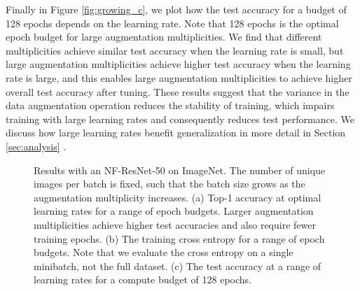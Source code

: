 \documentclass{article}
\begin{document}
Finally in Figure \ref{fig:growing_c}, we plot how the test accuracy for a budget of 128 epochs depends on the learning rate. Note that 128 epochs is the optimal epoch budget for large augmentation multiplicities. We find that different multiplicities achieve similar test accuracy when the learning rate is small, but large augmentation multiplicities achieve higher test accuracy when the learning rate is large, and this enables large augmentation multiplicities to achieve higher overall test accuracy after tuning. These results suggest that the variance in the data augmentation operation reduces the stability of training, which impairs training with large learning rates and consequently reduces test performance. We discuss how large learning rates benefit generalization in more detail in Section \ref{sec:analysis} \citep{li2019towards, smith2021origin}.
\begin{figure}[t]
\centering
  \vskip -3mm
  \vskip -2.5mm
\caption{Results with an NF-ResNet-50 on ImageNet. The number of unique images per batch is fixed, such that the batch size grows as the augmentation multiplicity  increases. (a) Top-1 accuracy at optimal learning rates for a range of epoch budgets. Larger augmentation multiplicities achieve higher test accuracies and also require fewer training epochs.
(b) The training cross entropy for a range of epoch budgets. Note that we evaluate the cross entropy on a single minibatch, not the full dataset.
(c) The test accuracy at a range of learning rates for a compute budget of 128 epochs.
}
\label{fig:growing:imagenet}
  \vskip -2.5mm
\end{figure}
\end{document}
